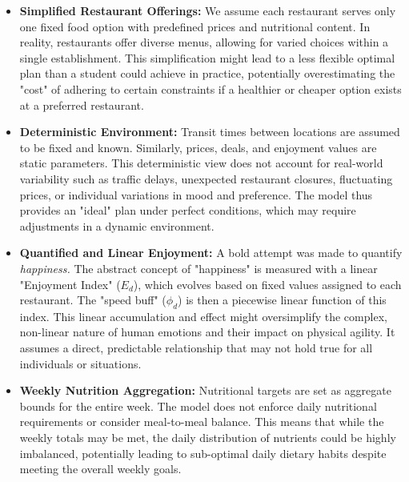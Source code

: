\documentclass{article}
\begin{document}
\begin{itemize}
    \item \textbf{Simplified Restaurant Offerings:} We assume each restaurant serves only one fixed food option with predefined prices and nutritional content. In reality, restaurants offer diverse menus, allowing for varied choices within a single establishment. This simplification might lead to a less flexible optimal plan than a student could achieve in practice, potentially overestimating the "cost" of adhering to certain constraints if a healthier or cheaper option exists at a preferred restaurant.

    \item \textbf{Deterministic Environment:} Transit times between locations are assumed to be fixed and known. Similarly, prices, deals, and enjoyment values are static parameters. This deterministic view does not account for real-world variability such as traffic delays, unexpected restaurant closures, fluctuating prices, or individual variations in mood and preference. The model thus provides an "ideal" plan under perfect conditions, which may require adjustments in a dynamic environment.

    \item \textbf{Quantified and Linear Enjoyment:} A bold attempt was made to quantify \textit{happiness.} The abstract concept of "happiness" is measured with a linear "Enjoyment Index" ($E_d$), which evolves based on fixed values assigned to each restaurant. The "speed buff" ($\phi_d$) is then a piecewise linear function of this index. This linear accumulation and effect might oversimplify the complex, non-linear nature of human emotions and their impact on physical agility. It assumes a direct, predictable relationship that may not hold true for all individuals or situations.

    \item \textbf{Weekly Nutrition Aggregation:} Nutritional targets are set as aggregate bounds for the entire week. The model does not enforce daily nutritional requirements or consider meal-to-meal balance. This means that while the weekly totals may be met, the daily distribution of nutrients could be highly imbalanced, potentially leading to sub-optimal daily dietary habits despite meeting the overall weekly goals.


    
\end{itemize}
\end{document}
